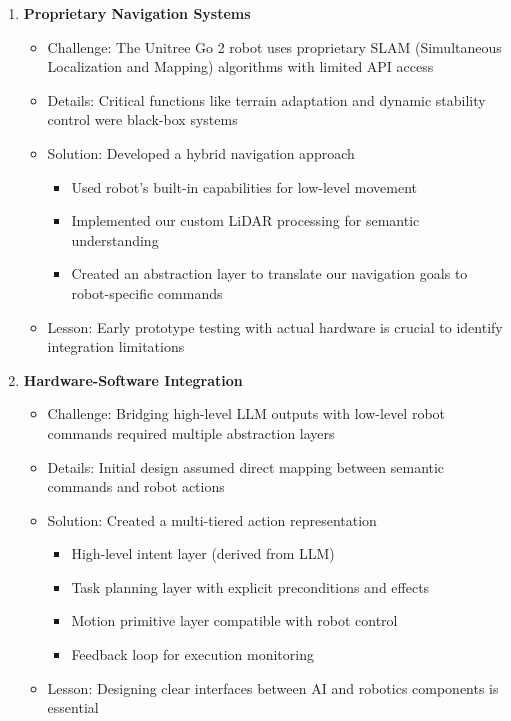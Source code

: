 \documentclass[12pt]{article}
\begin{document}
\begin{enumerate}
    \item \textbf{Proprietary Navigation Systems}
    \begin{itemize}
        \item Challenge: The Unitree Go 2 robot uses proprietary SLAM (Simultaneous Localization and Mapping) algorithms with limited API access
        \item Details: Critical functions like terrain adaptation and dynamic stability control were black-box systems
        \item Solution: Developed a hybrid navigation approach
        \begin{itemize}
            \item Used robot's built-in capabilities for low-level movement
            \item Implemented our custom LiDAR processing for semantic understanding
            \item Created an abstraction layer to translate our navigation goals to robot-specific commands
        \end{itemize}
        \item Lesson: Early prototype testing with actual hardware is crucial to identify integration limitations
    \end{itemize}
    
    \item \textbf{Hardware-Software Integration}
    \begin{itemize}
        \item Challenge: Bridging high-level LLM outputs with low-level robot commands required multiple abstraction layers
        \item Details: Initial design assumed direct mapping between semantic commands and robot actions
        \item Solution: Created a multi-tiered action representation
        \begin{itemize}
            \item High-level intent layer (derived from LLM)
            \item Task planning layer with explicit preconditions and effects
            \item Motion primitive layer compatible with robot control
            \item Feedback loop for execution monitoring
        \end{itemize}
        \item Lesson: Designing clear interfaces between AI and robotics components is essential
    \end{itemize}
        

\end{enumerate}
\end{document}
